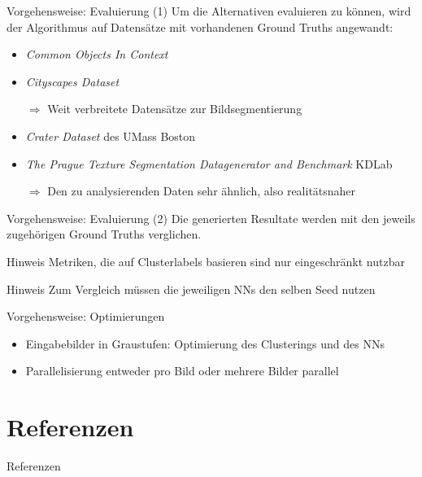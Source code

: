 \documentclass[9pt]{beamer}
\begin{document}
\begin{frame}{Vorgehensweise: Evaluierung (1)}
Um die Alternativen evaluieren zu können, wird der Algorithmus auf Datensätze mit vorhandenen Ground Truths angewandt:
\medskip
\begin{itemize}
	\item \textit{Common Objects In Context}\cite{LMBHPRDZ:ECCV:2014}
	\item \textit{Cityscapes Dataset}\cite{Cordts2016Cityscapes}
	\item[$\Rightarrow$] Weit verbreitete Datensätze zur Bildsegmentierung
	\medskip
	\item \textit{Crater Dataset} des UMass Boston
	\item \textit{The Prague Texture Segmentation Datagenerator and Benchmark}\cite{mikevs2015benchmarking}
	 KDLab\cite{umass_craters}
	\item[$\Rightarrow$] Den zu analysierenden Daten sehr ähnlich, also realitätsnaher
\end{itemize}

\end{frame}
\begin{frame}{Vorgehensweise: Evaluierung (2)}
Die generierten Resultate werden mit den jeweils zugehörigen Ground Truths verglichen.
\pause
\begin{block}{Hinweis}
	Metriken, die auf Clusterlabels basieren sind nur eingeschränkt nutzbar
\end{block}
\pause
\begin{block}{Hinweis}
	Zum Vergleich müssen die jeweiligen NNs den selben Seed nutzen
\end{block}
\end{frame}

\begin{frame}{Vorgehensweise: Optimierungen}
	\begin{itemize}
		\item Eingabebilder in Graustufen: Optimierung des Clusterings und des NNs
		\item Parallelisierung entweder pro Bild oder mehrere Bilder parallel
	\end{itemize}
\end{frame}

\section{Referenzen}

\begin{frame}[shrink=25]{Referenzen}
	
	
\end{frame}

	
\end{document}
